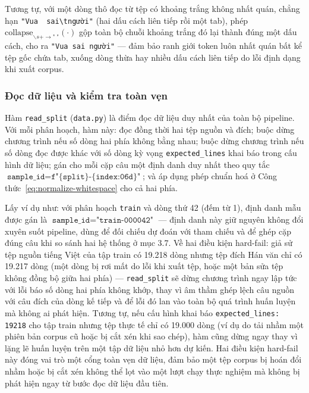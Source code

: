 Tương tự, với một dòng thô đọc từ tệp có khoảng trắng không nhất quán, chẳng hạn
\texttt{"Vua~~sai\textbackslash tngười"} (hai dấu cách liên tiếp rồi một tab), phép
$\mathrm{collapse}_{\backslash s+ \to \text{"~"}}(\cdot)$ gộp toàn bộ chuỗi khoảng trắng
đó lại thành đúng một dấu cách, cho ra \texttt{"Vua~sai~người"} — đảm bảo ranh giới token
luôn nhất quán bất kể tệp gốc chứa tab, xuống dòng thừa hay nhiều dấu cách liên tiếp do
lỗi định dạng khi xuất corpus.

\subsubsection{Đọc dữ liệu và kiểm tra toàn vẹn}

Hàm \texttt{read\_split} (\texttt{data.py}) là điểm đọc dữ liệu duy nhất của toàn bộ
pipeline. Với mỗi phân hoạch, hàm này: đọc đồng thời hai tệp nguồn và đích; buộc dừng
chương trình nếu số dòng hai phía không bằng nhau; buộc dừng chương trình nếu số dòng
đọc được khác với số dòng kỳ vọng \texttt{expected\_lines} khai báo trong cấu hình dữ
liệu; gán cho mỗi cặp câu một định danh duy nhất theo quy tắc
$\texttt{sample\_id} = \texttt{f"\{split\}-\{index:06d\}"}$; và áp dụng phép chuẩn hoá ở
Công thức~\ref{eq:normalize-whitespace} cho cả hai phía.

Lấy ví dụ như: với phân hoạch \texttt{train} và dòng thứ 42 (đếm từ 1), định danh mẫu
được gán là $\texttt{sample\_id} = \texttt{"train-000042"}$ — định danh này giữ nguyên
không đổi xuyên suốt pipeline, dùng để đối chiếu dự đoán với tham chiếu và để ghép cặp
đúng câu khi so sánh hai hệ thống ở mục 3.7. Về hai điều kiện hard-fail: giả sử tệp
nguồn tiếng Việt của tập train có 19.218 dòng nhưng tệp đích Hán văn chỉ có 19.217 dòng
(một dòng bị rơi mất do lỗi khi xuất tệp, hoặc một bản sửa tệp không đồng bộ giữa hai
phía) — \texttt{read\_split} sẽ dừng chương trình ngay lập tức với lỗi báo số dòng hai
phía không khớp, thay vì âm thầm ghép lệch câu nguồn với câu đích của dòng kế tiếp và để
lỗi đó lan vào toàn bộ quá trình huấn luyện mà không ai phát hiện. Tương tự, nếu cấu hình
khai báo \texttt{expected\_lines: 19218} cho tập train nhưng tệp thực tế chỉ có 19.000
dòng (ví dụ do tải nhầm một phiên bản corpus cũ hoặc bị cắt xén khi sao chép), hàm cũng
dừng ngay thay vì lặng lẽ huấn luyện trên một tập dữ liệu nhỏ hơn dự kiến. Hai điều kiện
hard-fail này đóng vai trò một cổng toàn vẹn dữ liệu, đảm bảo một tệp corpus bị hoán đổi
nhầm hoặc bị cắt xén không thể lọt vào một lượt chạy thực nghiệm mà không bị phát hiện
ngay từ bước đọc dữ liệu đầu tiên.

